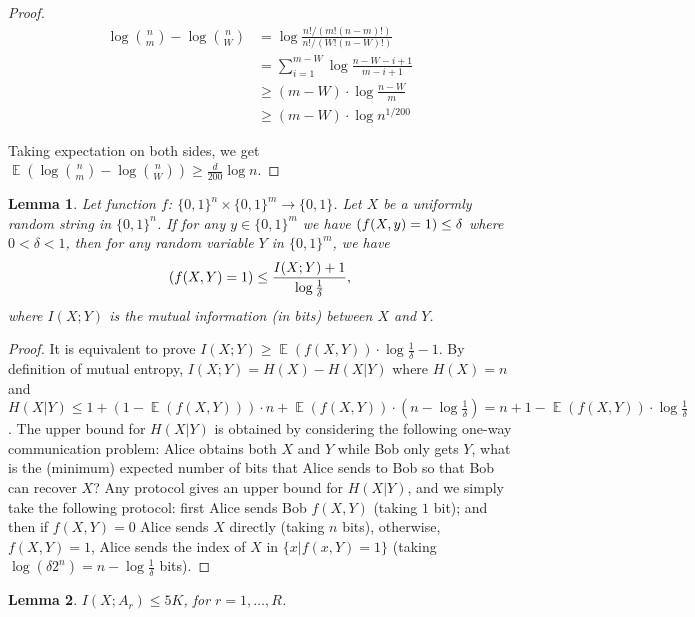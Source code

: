 \documentclass[10pt]{article}
\newtheorem{lemma}{Lemma}
\DeclareMathOperator*{\E}{\mathbb{E}}
\let\Pr\relax
\DeclareMathOperator*{\Pr}{\mathbb{P}}
\begin{document}
\begin{proof}
  \begin{align}
  \log {n \choose m}-\log {n \choose W}
  &=   \log \frac{n!/(m!(n-m)!)}{n!/(W!(n-W)!)} \\
  &=   \sum_{i=1}^{m-W}\log \frac{n-W-i+1}{m-i+1} \\
  &\ge (m-W)\cdot \log \frac{n-W}{m} \\
  &\ge (m-W)\cdot \log n^{1/200}
  \end{align}
  
  Taking expectation on both sides, we get $\E(\log {n \choose m}-\log {n \choose W})\ge \frac{d}{200} \log n$. 
\end{proof}

\begin{lemma}\label{lemma:mutual-entropy-vs-fail-prob}
  Let function $f$: $\{0,1\}^n\times \{0,1\}^m\rightarrow \{0,1\}$. Let $X$ be a uniformly random string in $\{0,1\}^n$. If for any $y\in \{0,1\}^m$ we have $\Pr(f(X,y)=1)\le \delta$ where $0<\delta<1$, then for any random variable $Y$ in $\{0,1\}^m$, we have 
  \begin{align}
  \Pr(f(X,Y)=1)\le \frac{I(X;Y)+1}{\log \frac{1}{\delta}},
  \end{align}
  where $I(X;Y)$ is the mutual information (in bits) between $X$ and $Y$.
\end{lemma}

\begin{proof}
  It is equivalent to prove $I(X;Y)\ge \E(f(X,Y))\cdot \log\frac{1}{\delta}-1$. By definition of mutual entropy, $I(X;Y)=H(X)-H(X|Y)$ where $H(X)=n$ and $H(X|Y)\le 1+(1-\E(f(X,Y)))\cdot n+\E(f(X,Y))\cdot (n-\log\frac{1}{\delta})=n+1-\E(f(X,Y))\cdot \log\frac{1}{\delta}$.
  The upper bound for $H(X|Y)$ is obtained by considering the following one-way communication problem: Alice obtains both $X$ and $Y$ while Bob only gets $Y$, what is the (minimum) expected number of bits that Alice sends to Bob so that Bob can recover $X$? Any protocol gives an upper bound for $H(X|Y)$, and we simply take the following protocol: first Alice sends Bob $f(X,Y)$ (taking $1$ bit); and then if $f(X,Y)=0$ Alice sends $X$ directly (taking $n$ bits), otherwise, $f(X,Y)=1$, Alice sends the index of $X$ in $\{x|f(x,Y)=1\}$ (taking $\log (\delta 2^n)=n-\log\frac{1}{\delta}$ bits).  
\end{proof}

\begin{lemma}\label{lemma:mutual-entropy-bound}
  $I(X;A_r)\le 5K$, for $r=1,\ldots, R$.
\end{lemma}
\end{document}

